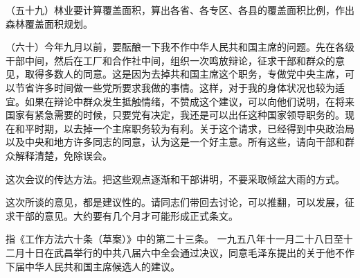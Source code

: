 （五十九）林业要计算覆盖面积，算出各省、各专区、各县的覆盖面积比例，作出森林覆盖面积规划。

（六十）今年九月以前，要酝酿一下我不作中华人民共和国主席的问题。先在各级干部中间，然后在工厂和合作社中间，组织一次鸣放辩论，征求干部和群众的意见，取得多数人的同意。这是因为去掉共和国主席这个职务，专做党中央主席，可以节省许多时间做一些党所要求我做的事情。这样，对于我的身体状况也较为适宜。如果在辩论中群众发生抵触情绪，不赞成这个建议，可以向他们说明，在将来国家有紧急需要的时候，只要党有决定，我还是可以出任这种国家领导职务的。现在和平时期，以去掉一个主席职务较为有利。关于这个请求，已经得到中央政治局以及中央和地方许多同志的同意，认为这是一个好主意。所有这些，请向干部和群众解释清楚，免除误会。

这次会议的传达方法。把这些观点逐渐和干部讲明，不要采取倾盆大雨的方式。

这次所谈的意见，都是建议性的。请同志们带回去讨论，可以推翻，可以发展，征求干部的意见。大约要有几个月才可能形成正式条文。

\begin{maonote}
指《工作方法六十条（草案）》中的第二十三条。
一九五八年十一月二十八日至十二月十日在武昌举行的中共八届六中全会通过决议，同意毛泽东提出的关于他不作下届中华人民共和国主席候选人的建议。
\end{maonote}
